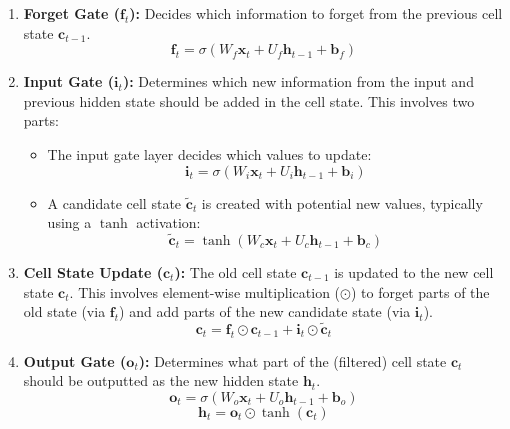 \begin{enumerate}
  \item \textbf{Forget Gate (\( \bm{f}_t \)):} Decides which information to forget from the previous cell state \( \bm{c}_{t-1} \).
        \begin{equation}
          \bm{f}_t = \sigma(W_f \bm{x}_t + U_f \bm{h}_{t-1} + \bm{b}_f)
          \label{eq:lstm-forget-gate}
        \end{equation}

  \item \textbf{Input Gate (\( \bm{i}_t \)):} Determines which new information from the input and previous hidden state should be added in the cell state. This involves two parts:
        \begin{itemize}
          \item The input gate layer decides which values to update:
                \begin{equation}
                  \bm{i}_t = \sigma(W_i \bm{x}_t + U_i \bm{h}_{t-1} + \bm{b}_i)
                  \label{eq:lstm-input-gate}
                \end{equation}
          \item A candidate cell state \( \bm{\tilde{c}}_t \) is created with potential new values, typically using a \( \tanh \) activation:
                \begin{equation}
                  \bm{\tilde{c}}_t = \tanh(W_c \bm{x}_t + U_c \bm{h}_{t-1} + \bm{b}_c)
                  \label{eq:lstm-candidate-cell}
                \end{equation}
        \end{itemize}

  \item \textbf{Cell State Update (\( \bm{c}_t \)):} The old cell state \( \bm{c}_{t-1} \) is updated to the new cell state \( \bm{c}_t \). This involves element-wise multiplication (\(\odot\)) to forget parts of the old state (via \( \bm{f}_t \)) and add parts of the new candidate state (via \( \bm{i}_t \)).
        \begin{equation}
          \bm{c}_t = \bm{f}_t \odot \bm{c}_{t-1} + \bm{i}_t \odot \bm{\tilde{c}}_t
          \label{eq:lstm-cell-update}
        \end{equation}

  \item \textbf{Output Gate (\( \bm{o}_t \)):} Determines what part of the (filtered) cell state \( \bm{c}_t \) should be outputted as the new hidden state \( \bm{h}_t \).
        \begin{equation}
          \bm{o}_t = \sigma(W_o \bm{x}_t + U_o \bm{h}_{t-1} + \bm{b}_o)
          \label{eq:lstm-output-gate}
        \end{equation}
        \begin{equation}
          \bm{h}_t = \bm{o}_t \odot \tanh(\bm{c}_t)
          \label{eq:lstm-hidden-state}
        \end{equation}
\end{enumerate}


